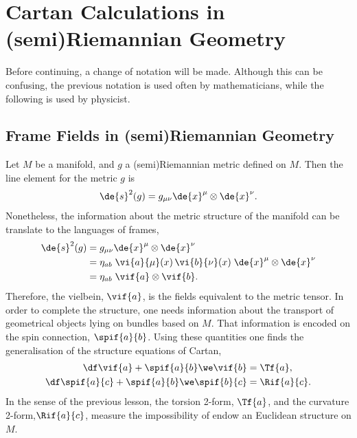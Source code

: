 
\chapter{Cartan Calculations in (semi)Riemannian Geometry}

Before continuing, a change of notation will be made. Although this can be confusing, the previous notation is used often by mathematicians, while the following is used by physicist.

\section{Frame Fields in (semi)Riemannian Geometry}


Let $M$ be a manifold, and $g$ a (semi)Riemannian metric defined on $M$. Then the line element for the metric $g$ is
\begin{align}
  \de{s}^2(g) = g_{\mu\nu} \de{x}^\mu \otimes \de{x}^\nu.
\end{align}
Nonetheless, the information about the metric structure of the manifold can be translate to the languages of frames,
\begin{equation}
  \begin{split}
    \de{s}^2(g)
    &= g_{\mu\nu} \de{x}^\mu \otimes \de{x}^\nu \\
    &= \eta_{ab} \; \vi{a}{\mu}(x) \, \vi{b}{\nu}(x) \; \de{x}^\mu \otimes \de{x}^\nu \\
    &= \eta_{ab} \; \vif{a} \otimes \vif{b}.
  \end{split}
\end{equation}
Therefore, the vielbein, $\vif{a}$, is the fields equivalent to the metric tensor. In order to complete the structure, one needs information about the transport of geometrical objects lying on bundles based on $M$. That information is encoded on the spin connection, $\spif{a}{b}$. Using these quantities one finds  the generalisation of the structure equations of Cartan,
\begin{align}
  \df \vif{a} + \spif{a}{b} \we \vif{b} &= \Tf{a},
  \label{firstSE}\\
  \df \spif{a}{c} + \spif{a}{b} \we \spif{b}{c} &= \Rif{a}{c}
  \label{secondSE}.
\end{align}
In the sense of the previous lesson, the torsion 2-form, $\Tf{a}$, and the curvature 2-form,$\Rif{a}{c}$, measure the impossibility of endow an Euclidean structure on $M$.

